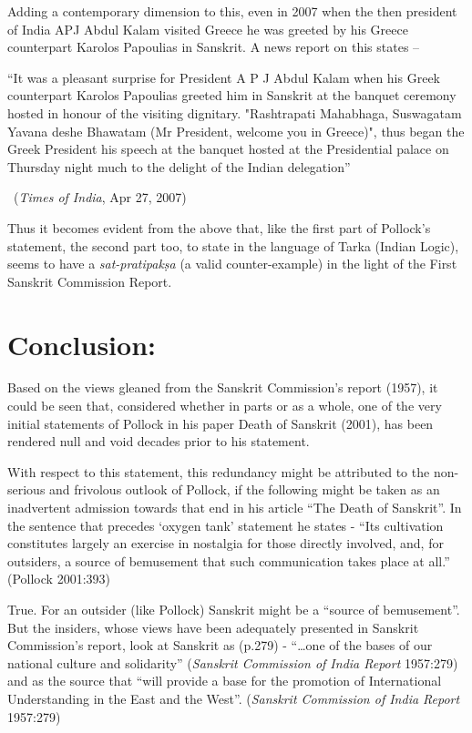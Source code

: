 Adding a contemporary dimension to this, even in 2007 when the then president of India APJ Abdul Kalam visited Greece he was greeted by his Greece counterpart Karolos Papoulias in Sanskrit. A news report on this states –
\begin{myquote}
\eleven
“It was a pleasant surprise for President A P J Abdul Kalam when his Greek counterpart Karolos Papoulias greeted him in Sanskrit at the banquet ceremony hosted in honour of the visiting dignitary.  "Rashtrapati Mahabhaga, Suswagatam Yavana deshe Bhawatam (Mr President, welcome you in Greece)", thus began the Greek President his speech at the banquet hosted at the Presidential palace on Thursday night much to the delight of the Indian delegation” 
\vskip -5pt

~\hfill ({\sl Times of India}, Apr 27, 2007) 
\end{myquote}

Thus it becomes evident from the above that, like the first part of Pollock’s statement, the second part too, to state in the language of Tarka (Indian Logic), seems to have a {\sl sat-pratipakṣa} (a valid counter-example) in the light of the First Sanskrit Commission Report.

\section{Conclusion:}

Based on the views gleaned from the Sanskrit Commission’s report (1957), it could be seen that, considered whether in parts or as a whole, one of the very initial statements of Pollock in his paper Death of Sanskrit (2001), has been rendered null and void decades prior to his statement.

With respect to this statement, this redundancy might be attributed to the non-serious and frivolous outlook of Pollock, if the following might be taken as an inadvertent admission towards that end in his article “The Death of Sanskrit”. In the sentence that precedes ‘oxygen tank’ statement he states - “Its cultivation constitutes largely an exercise in nostalgia for those directly involved, and, for outsiders, a source of bemusement that such communication takes place at all.” (Pollock  2001:393)

True. For an outsider (like Pollock) Sanskrit might be a “source of bemusement”. But the insiders, whose views have been adequately presented in Sanskrit Commission’s report, look at Sanskrit as (p.279) - “…one of the bases of our national culture and solidarity” ({\sl Sanskrit Commission of India Report} 1957:279) and as the source that “will provide a base for the promotion of International Understanding in the East and the West”. ({\sl Sanskrit Commission of India Report} 1957:279)

